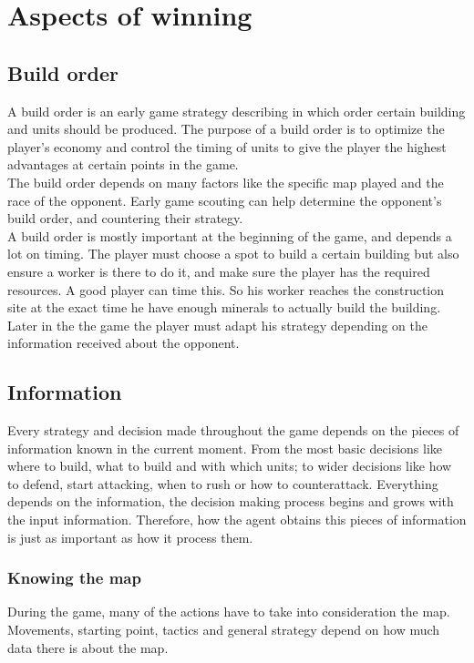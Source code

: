 \section{Aspects of winning}
	\subsection{Build order}
		A build order is an early game strategy describing in which order certain building and units should be produced\cite{wiki_build_order}. 
		The purpose of a build order is to optimize the player's economy and control the timing of units to give 
		the player the highest advantages at certain points in the game.\\
		The build order depends on many factors like the specific map played and the race of the opponent. 
		Early game scouting can help determine the opponent's build order, and countering their strategy.\\
		
		A build order is mostly important at the beginning of the game, and depends a lot on timing. 
		The player must choose a spot to build a certain building but also ensure a worker is there to do it, 
		and make sure the player has the required resources. 
		A good player can time this. 
		So his worker reaches the construction site at the exact time he have enough minerals to actually build the building.\\
		
		Later in the the game the player must adapt his strategy depending on the information received about the opponent.
	
	\subsection{Information}

		Every strategy and decision made throughout the game depends on the pieces of information 
		known in the current moment. From the most basic decisions like where to build, what to build and
		with which units; to wider decisions like how to defend, start attacking, when to rush or how to counterattack.
		Everything depends on the information, the decision making process begins and grows with the input information.
		Therefore, how the agent obtains this pieces of information is just as important 
		as how it process them. 
	
			\subsubsection{Knowing the map}
				During the game, many of the actions have to take into consideration the map. Movements, starting point, 
				tactics and general strategy depend on how much data there is about the map.  
				
